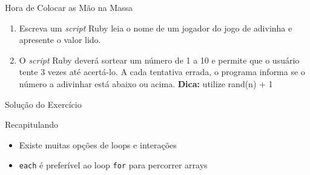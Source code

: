 \begin{frame}{Hora de Colocar as Mão na Massa}
  \begin{enumerate}
    \item Escreva um \textit{script} Ruby leia o nome de um jogador do jogo de adivinha e 
      apresente o valor lido.
    \item O \textit{script} Ruby deverá sortear um número de 1 a 10 e permite que 
    o usuário tente 3 vezes até acertá-lo. A cada tentativa errada, o programa informa
    se o número a adivinhar está abaixo ou acima. \textbf{Dica:} utilize rand(n) + 1 
  \end{enumerate}
  \framebreak
\end{frame}
\begin{frame}{Solução do Exercício}
  
\end{frame}

\begin{frame}[fragile,t]{Recapitulando}
  \begin{itemize}
    \item Existe muitas opções de loops e interações
    \item \verb!each! é \alert{preferível} ao loop \verb!for! para percorrer arrays
  \end{itemize}
\end{frame}



